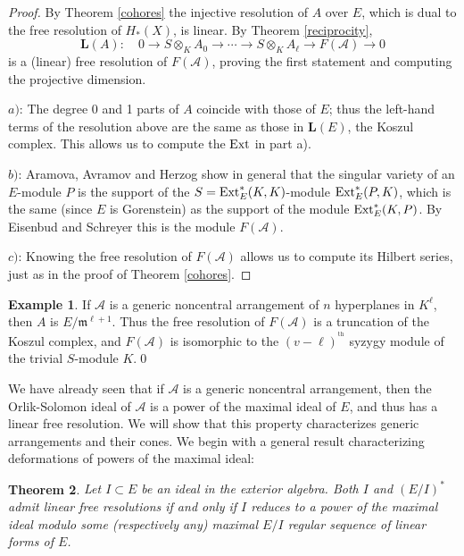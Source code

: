 \documentclass{tran-l}
\newtheorem{theorem}{Theorem}[section]
\theoremstyle{definition}
\newtheorem{example}[theorem]{Example}
\theoremstyle{remark}
\newcommand{\thh}{{^{\mathrm {th}}}}
\newcommand{\Acal}{{{\mathcal A}}}
\newcommand{\LL}{{\mathbf{L}}}
\newcommand{\gm}{{\mathfrak m}}
\newcommand{\Ext}{\mathop{\rm Ext}\nolimits}
\begin{document}
\begin{proof} By
Theorem \ref{cohores} the injective resolution of $A$ over $E$, which
is dual to the free resolution of $H_*(X)$, is linear. 
By Theorem  \ref{reciprocity},
\[
\LL(A):\quad 
0\to S\otimes_K A_0\to\cdots\to 
S\otimes_K A_\ell \to F(\Acal)\to 0
\] 
is a (linear) free resolution of $F(\Acal)$, proving the first
statement and computing the projective dimension.

$a)$: The degree 0 and 1 parts of $A$ coincide with those
of $E$; thus the left-hand terms of the resolution above
are the same as those in $\LL(E)$, the Koszul complex. This
allows us to compute the $\Ext$ in part a).

$b)$: Aramova, Avramov and Herzog \cite{AAH} show in general that
the singular variety of an $E$-module $P$ 
is the support of the $S=\Ext_E^*( K, K)$-module
$\Ext_E^*(P, K)$, which is the same (since $E$ is
Gorenstein) as the support of the module $\Ext_E^*( K,P)$.
By  Eisenbud and Schreyer \cite[Proposition 2.3]{ES}
this is the module $F(\Acal)$.

$c)$: Knowing the free resolution of $F(\Acal)$ allows us to
compute its Hilbert series, just as in 
the proof of Theorem \ref{cohores}.\end{proof}

\begin{example}\label{genericexamplecontinued}
If $\Acal$ is a generic noncentral arrangement of $n$ hyperplanes in
$ K^\ell$, then $A$ is $E/\gm^{\ell+1}$. Thus the
free resolution of $F(\Acal)$ is a truncation of the Koszul complex,
and $F(\Acal)$ is isomorphic to the $(v-\ell)^\thh$ syzygy module
of the trivial $S$-module $ K$.\qed
\end{example}

We have already seen that if $\Acal$ is a generic noncentral arrangement,
then the Orlik-Solomon ideal of $\Acal$ is a power of the maximal
ideal of $E$, and thus has a linear free resolution. We will
show that this property characterizes generic arrangements and
their cones. We begin with a general result characterizing
deformations of powers of the maximal ideal:


\begin{theorem}\label{characterizationofpowers}
Let $I\subset E$
be an ideal in the exterior algebra. Both $I$ and $(E/I)^*$
admit linear free resolutions if and only if $I$ reduces to
a power of the maximal ideal modulo some (respectively any)
maximal $E/I$ regular sequence of linear forms of $E$.
\end{theorem}
\end{document}
